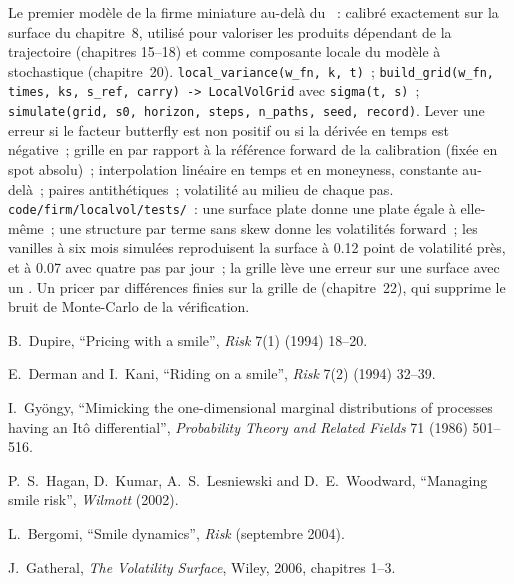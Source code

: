 \begin{build}
 Le premier modèle de la firme miniature au-delà du ~: calibré exactement sur la surface du
chapitre~8, utilisé pour valoriser les produits dépendant de la trajectoire (chapitres 15--18) et comme composante locale du modèle
à  stochastique (chapitre~20).
 \texttt{local\_variance(w\_fn, k, t)}~; \texttt{build\_grid(w\_fn, times, ks, s\_ref, carry)
-> LocalVolGrid} avec \texttt{sigma(t, s)}~; \texttt{simulate(grid, s0, horizon, steps, n\_paths, seed,
record)}.
 Lever une erreur si le facteur butterfly est non positif ou si la dérivée en temps est négative~; grille en 
par rapport à la référence forward de la calibration (fixée en spot absolu)~; interpolation linéaire en temps et en moneyness, constante
au-delà~; paires antithétiques~; volatilité au milieu de chaque pas.
 \texttt{code/firm/localvol/tests/}~: une surface plate donne une  plate égale
à elle-même~; une structure par terme sans skew donne les volatilités forward~; les vanilles à six mois simulées reproduisent la
surface à 0.12 point de volatilité près, et à 0.07 avec quatre pas par jour~; la grille lève une erreur sur une surface avec
un .
 Un pricer par différences finies sur la grille de  (chapitre~22), qui
supprime le bruit de Monte-Carlo de la vérification.
\end{build}

\begin{omsources}
\item B.~Dupire, ``Pricing with a smile'', \emph{Risk} 7(1) (1994) 18--20.
\item E.~Derman and I.~Kani, ``Riding on a smile'', \emph{Risk} 7(2) (1994) 32--39.
\item I.~Gyöngy, ``Mimicking the one-dimensional marginal distributions of processes having an Itô
differential'', \emph{Probability Theory and Related Fields} 71 (1986) 501--516.
\item P.~S.~Hagan, D.~Kumar, A.~S.~Lesniewski and D.~E.~Woodward, ``Managing smile risk'', \emph{Wilmott}
(2002).
\item L.~Bergomi, ``Smile dynamics'', \emph{Risk} (septembre 2004).
\item J.~Gatheral, \emph{The Volatility Surface}, Wiley, 2006, chapitres 1--3.
\end{omsources}

